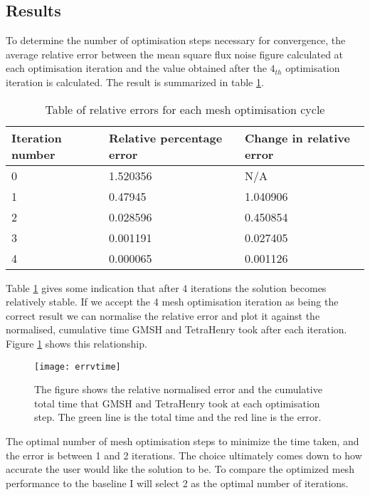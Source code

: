 \subsection{Results}

To determine the number of optimisation steps necessary for convergence, the average relative error between the mean square flux noise figure calculated at each optimisation iteration and the value obtained after the $4_{th}$ optimisation iteration is calculated. The result is summarized in table \ref{tab:relerr}.


\begin{table}[H]
    \centering
    \begin{tabular}{lll}
    \hline
    Iteration number & Relative percentage error & Change in relative error \\ \hline
    0                & 1.520356                  & N/A                      \\
    1                & 0.47945                   & 1.040906                 \\
    2                & 0.028596                  & 0.450854                 \\
    3                & 0.001191                  & 0.027405                 \\
    4                & 0.000065                  & 0.001126                 \\ \hline         
    \end{tabular}
    \caption{Table of relative errors for each mesh optimisation cycle}
    \label{tab:relerr}
\end{table}

Table \ref{tab:relerr} gives some indication that after 4 iterations the solution becomes relatively stable. If we accept the 4 mesh optimisation iteration as being the correct result we can normalise the relative error and plot it against the normalised, cumulative time GMSH and TetraHenry took after each iteration. Figure \ref{fig:errvtime} shows this relationship.

\begin{figure}[H]
    \centering
    \texttt{[image: errvtime]}
    \caption{The figure shows the relative normalised error and the cumulative total time that GMSH and TetraHenry took at each optimisation step. The green line is the total time and the red line is the error.}
    \label{fig:errvtime}
\end{figure}

The optimal number of mesh optimisation steps to minimize the time taken, and the error is between 1 and 2 iterations. The choice ultimately comes down to how accurate the user would like the solution to be. To compare the optimized mesh performance to the baseline I will select 2 as the optimal number of iterations.